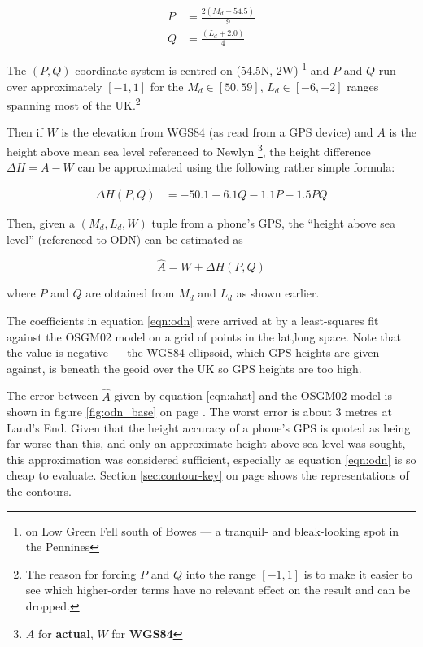 \documentclass[10pt,a4paper]{article}
\begin{document}
\begin{align}
P & = \frac{2\left(M_d - 54.5\right)}{9} \\
  Q & = \frac{\left(L_d + 2.0\right)}{4}
\end{align}

The $(P,Q)$ coordinate system is centred on (54.5\degree{}N, 2\degree{}W)
\footnote{on Low Green Fell south of Bowes --- a tranquil- and bleak-looking
spot in the Pennines}
and $P$ and $Q$ run over approximately $[-1,1]$ for the $M_d \in [50,59]$, $L_d
\in [-6,+2]$ ranges spanning most of the UK.\footnote{The reason for forcing
$P$ and $Q$ into the range $[-1,1]$ is to make it easier to see which
higher-order terms have no relevant effect on the result and can be dropped.}

Then if $W$ is the elevation from WGS84 (as read from a GPS device) and $A$ is
the height above mean sea level referenced to Newlyn
\footnote{$A$ for \textbf{actual}, $W$ for \textbf{WGS84}},
the height difference $\Delta H = A-W$ can be approximated using the following
rather simple formula:

\begin{align}
  \Delta H(P,Q) &= -50.1 + 6.1Q - 1.1P - 1.5 PQ
  \label{eqn:odn}
\end{align}

Then, given a $(M_d,L_d,W)$ tuple from a phone's GPS, the ``height above sea
level'' (referenced to ODN) can be estimated as

\begin{equation}
\hat{A} = W + \Delta H(P,Q)
\label{eqn:ahat}
\end{equation}

where $P$ and $Q$ are obtained from $M_d$ and $L_d$ as shown earlier.

The coefficients in equation \eqref{eqn:odn} were arrived at by a least-squares
fit against the OSGM02 model on a grid of points in the lat,long space.  Note
that the value is negative --- the WGS84 ellipsoid, which GPS heights are given
against, is beneath the geoid over the UK so GPS heights are too high.

The error between $\hat{A}$ given by equation \eqref{eqn:ahat} and the OSGM02
model is shown in figure \ref{fig:odn_base} on page \pageref{fig:odn_base}.  The worst
error is about 3 metres at Land's End.  Given that the height accuracy of a
phone's GPS is quoted as being far worse than this, and only an approximate
height above sea level was sought, this approximation was considered
sufficient, especially as equation \eqref{eqn:odn} is so cheap to evaluate.
Section \ref{sec:contour-key} on page \pageref{sec:contour-key} shows the
representations of the contours.
\end{document}

